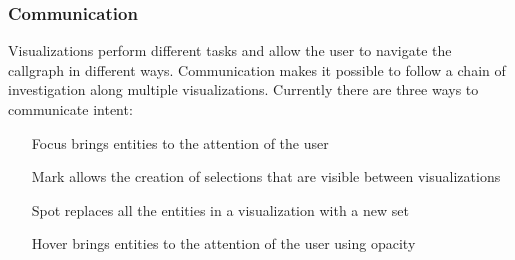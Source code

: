 \subsubsection{Communication}

Visualizations perform different tasks and allow the user to navigate the
callgraph in different ways. Communication makes it possible to follow a chain
of investigation along multiple visualizations. Currently there are three ways
to communicate intent:

\begin{itemize}
	\item[Focus] brings entities to the attention of the user
	\item[Mark] allows the creation of selections that are visible between
visualizations
	\item[Spot] replaces all the entities in a visualization with a new set
	\item[Hover] brings entities to the attention of the user using opacity
\end{itemize}
